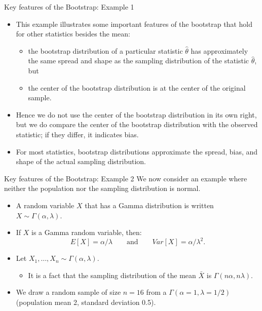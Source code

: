 \documentclass[
  ignorenonframetext,
]{beamer}
\providecommand{\tightlist}{%
  \setlength{\itemsep}{0pt}\setlength{\parskip}{0pt}}
\begin{document}
\begin{frame}{Key features of the Bootstrap: Example 1}
\label{key-features-of-the-bootstrap-example-1-4}
\begin{itemize}
\item
  This example illustrates some important features of the bootstrap that
  hold for other statistics besides the mean:

  \begin{itemize}
  \tightlist
  \item
    the bootstrap distribution of a particular statistic
    \(\hat{\theta}\) has approximately the same spread and shape as the
    sampling distribution of the statistic \(\hat{\theta}\), but
  \item
    the center of the bootstrap distribution is at the center of the
    original sample.
  \end{itemize}
\item
  Hence we do not use the center of the bootstrap distribution in its
  own right, but we do compare the center of the bootstrap distribution
  with the observed statistic; if they differ, it indicates bias.
\item
  For most statistics, bootstrap distributions approximate the spread,
  bias, and shape of the actual sampling distribution.
\end{itemize}
\end{frame}

\begin{frame}{Key features of the Bootstrap: Example 2}
\label{key-features-of-the-bootstrap-example-2}
We now consider an example where neither the population nor the sampling
distribution is normal.

\begin{itemize}
\item
  A random variable \(X\) that has a Gamma distribution is written
  \(X\sim \Gamma(\alpha, \lambda)\).
\item
  If \(X\) is a Gamma random variable, then:
  \[E[X]=\alpha/\lambda \quad \quad \text{and} \quad \quad Var[X]=\alpha/\lambda^2.\]
\item
  Let \(X_1, \ldots, X_n\sim \Gamma(\alpha, \lambda)\).

  \begin{itemize}
  \tightlist
  \item
    It is a fact that the sampling distribution of the mean \(\bar{X}\)
    is \(\Gamma(n\alpha, n\lambda)\).
  \end{itemize}
\item
  We draw a random sample of size \(n=16\) from a
  \(\Gamma(\alpha=1, \lambda=1/2)\) (population mean 2, standard
  deviation 0.5).
\end{itemize}
\end{frame}
\end{document}
